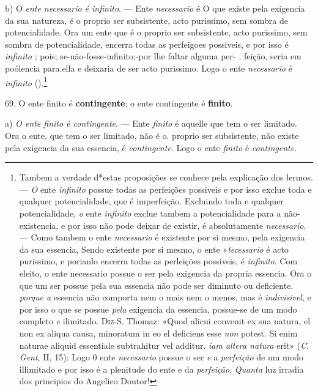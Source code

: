 b) O \emph{ente necessario é infinito}. --- Ente \emph{necessario} é O que existe pela exigencia da sua natureza, é o proprio ser subsistente, acto purissimo, sem sombra de potencialidade. Ora um ente que é o proprio ser subsistente, acto purissimo, sem sombra de potencialidade, encerra todas as perfeigoes possiveis, e por isso é \emph{infinito} ; pois; se-não-fosse-infinito;-por lhe faltar alguma per- . feição, seria em poólencia para.ella e deixaria de ser acto purissimo. Logo o ente \emph{necessario} é \emph{infinito} ().\footnote{Tambem a verdade d*estas proposições se conhece pela explicação dos lermos. --- \emph{O} ente \emph{infinito} possue todas as perfeições possiveis e por isso exclue toda e qualquer potencialidade, que é imperfeição. Excluindo toda e qualquer potencialidade, \emph{o} ente \emph{infinito} exclue tambem a potencialidade para a não-existencia, e por isso não pode deixar de existir, é absolutamente \emph{necessario}. --- Como tambem o ente \emph{necessario} é existente por si mesmo, pela exigencia da sua essencia, Sendo existente por si mesmo, o ente »\emph{tecessario} é acto purissimo, e porianlo encerra todas as perleições possiveis, é \emph{infinito}. Com eleito, o ente necessario possue o ser pela exigencia da propria essencia. Ora o que um ser possue pela sua essencia não pode ser diminuto ou deficiente. \emph{porque a} essencia não comporta nem o mais nem o menos, mas é \emph{indivisivel}, e por isso o que se possue \emph{pela} exigencia da essencia, possue-se de um modo completo \emph{e} ilimitado. \textsc{Diz-S}. Thomaz: «Quod alicui convenit ex sua natura, el non ex aliqua causa, minoratum in eo el deficiens esse \emph{non} potest. Si enim naturae aliquid essentiale subtrahitur vel additur. \emph{iam altera natura} erit» (\emph{C}. \emph{Gent}, II, 15): Logo 0 ente \emph{necessario} possue o ser \emph{e} a \emph{perfeição} de um modo illimitado e por isso é a plenitude do ente e da \emph{perfeição}, \emph{Quanta} luz irradia dos principios do Angelico Doutor!}

 69. O ente finito é \textbf{contingente}; o ente contingente é \textbf{finito}.

a) \emph{O ente finito é contingente}. --- Ente \emph{finito} é aquelle que tem o ser limitado. Ora o ente, que tem o ser limitado, não é o. proprio ser subsistente, não existe pela exigencia da sua essencia, é \emph{contingente}. Logo o ente \emph{finito} é \emph{contingente}.

